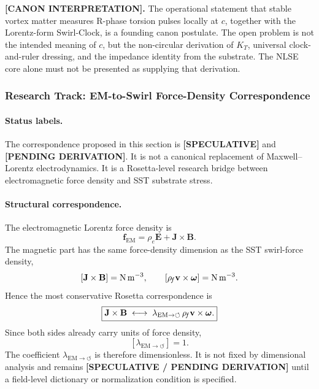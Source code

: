 \textbf{[CANON INTERPRETATION].}
The operational statement that stable vortex matter measures R-phase torsion
pulses locally at \(c\), together with the Lorentz-form Swirl-Clock, is a founding
canon postulate. The open problem is not the intended meaning of \(c\), but the
non-circular derivation of \(K_T\), universal clock-and-ruler dressing, and the
impedance identity from the substrate. The NLSE core alone must not be presented
as supplying that derivation.



\subsubsection{Research Track: EM-to-Swirl Force-Density Correspondence}
\label{sec:research_em_to_swirl_force_density_correspondence}

\paragraph{Status labels.}
The correspondence proposed in this section is \textbf{[SPECULATIVE]} and
\textbf{[PENDING DERIVATION]}.  It is not a canonical replacement of
Maxwell--Lorentz electrodynamics.  It is a Rosetta-level research bridge
between electromagnetic force density and SST substrate stress.

\paragraph{Structural correspondence.}
The electromagnetic Lorentz force density is
\[
\mathbf f_{\mathrm{EM}}
=
\rho_e\mathbf E+\mathbf J\times\mathbf B .
\]
The magnetic part has the same force-density dimension as the SST
swirl-force density,
\[
[\mathbf J\times\mathbf B]
=
\mathrm{N\,m^{-3}},
\qquad
[\rho_{\!f}\mathbf v\times\boldsymbol{\omega}]
=
\mathrm{N\,m^{-3}}.
\]
Hence the most conservative Rosetta correspondence is
\[
\boxed{
\mathbf J\times\mathbf B
\;\longleftrightarrow\;
\lambda_{\mathrm{EM}\to\circlearrowleft}\,
\rho_{\!f}\mathbf v\times\boldsymbol{\omega}.
}
\]
Since both sides already carry units of force density,
\[
\boxed{
[\lambda_{\mathrm{EM}\to\circlearrowleft}]=1 .
}
\]
The coefficient
\(\lambda_{\mathrm{EM}\to\circlearrowleft}\) is therefore dimensionless.
It is not fixed by dimensional analysis and remains
\textbf{[SPECULATIVE / PENDING DERIVATION]} until a field-level dictionary or
normalization condition is specified.

